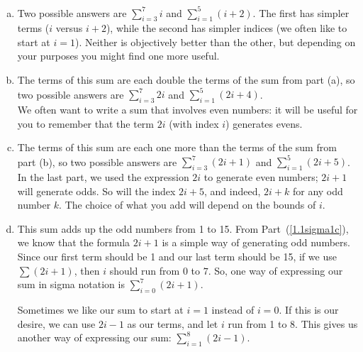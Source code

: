 \begin{solution}
\begin{enumerate}[(a)]
\item Two possible answers are $\displaystyle\sum_{i=3}^7 i$ and $\displaystyle\sum_{i=1}^5 (i+2)$. The first has simpler terms ($i$ versus $i+2$), while the second has simpler indices (we often like to start at $i=1$). Neither is objectively better than the other, but  depending on your purposes you might find one more useful.
\item The terms of this sum are each double the terms of the sum from part (a), so two possible answers are $\displaystyle\sum_{i=3}^7 2i$ and $\displaystyle\sum_{i=1}^5 (2i+4)$. \\
We often want to write a sum that involves even numbers: it will be useful for you to remember that the term  $2i$ (with index $i$) generates evens.
\item\label{1.1sigma1c} The terms of this sum are each one more than the terms of the  sum from part (b), so two possible answers are $\displaystyle\sum_{i=3}^7 (2i+1)$ and $\displaystyle\sum_{i=1}^5 (2i+5)$. \\
In the last part, we used the expression $2i$ to generate even numbers; $2i+1$ will generate odds. So will the index $2i+5$, and indeed, $2i+k$ for any odd number $k$. The choice of what you add will depend on the bounds of $i$.
\item This sum adds up the odd numbers from 1 to 15. From  Part~(\ref{1.1sigma1c}), we know that the formula $2i+1$ is a simple way of generating odd numbers. Since our first term should be 1 and our last term should be 15, if we use $\sum (2i+1)$, then $i$ should run from $0$ to $7$. So, one way of expressing our sum in sigma notation is $\displaystyle\sum_{i=0}^7 (2i+1)$.

Sometimes we like our sum to start at $i=1$ instead of $i=0$. If this is our desire, we can use $2i-1$ as our terms, and let $i$ run from 1 to 8. This gives us another way of expressing our sum:
 $\displaystyle\sum_{i=1}^8 (2i-1)$.
\end{enumerate}
\end{solution}

